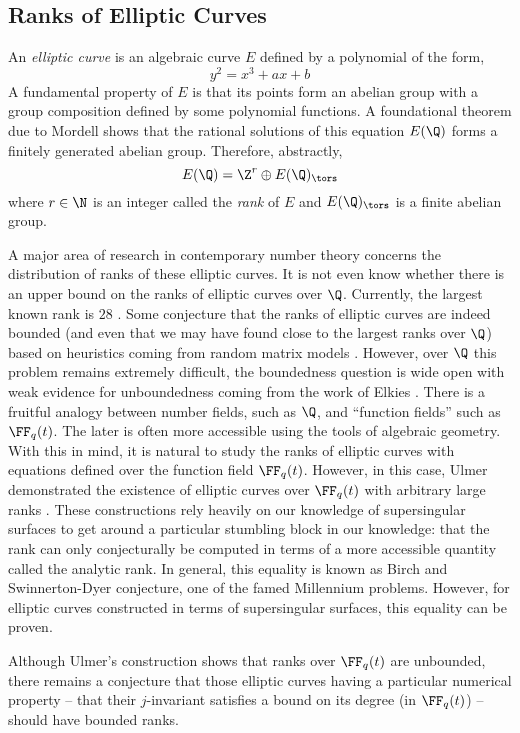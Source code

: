\documentclass[12pt]{article}
\begin{document}
\subsection{Ranks of Elliptic Curves}

An \textit{elliptic curve} is an algebraic curve $E$ defined by a polynomial of the form,
\[ y^2 = x^3 + ax + b \]
A fundamental property of $E$ is that its points form an abelian group with a group composition defined by some polynomial functions. A foundational theorem due to Mordell shows that the rational solutions of this equation $E(\Q)$ forms a finitely generated abelian group. Therefore, abstractly,
\[ E(\Q) = \Z^r \oplus E(\Q)_{\tors} \]
where $r \in \N$ is an integer called the \textit{rank} of $E$ and $E(\Q)_{\tors}$ is a finite abelian group. 
\bigskip \par
A major area of research in contemporary number theory concerns the distribution of ranks of these elliptic curves. It is not even know whether there is an upper bound on the ranks of elliptic curves over $\Q$. Currently, the largest known rank is $28$ \cite{elkies_28}. Some conjecture that the ranks of elliptic curves are indeed bounded (and even that we may have found close to the largest ranks over $\Q$) based on heuristics coming from random matrix models \cite{park_heuristic}. However, over $\Q$ this problem remains extremely difficult, the boundedness question is wide open with weak evidence for unboundedness coming from the work of Elkies \cite{elkies}. There is a fruitful analogy between number fields, such as $\Q$, and ``function fields'' such as $\FF_q(t)$. The later is often more accessible using the tools of algebraic geometry. With this in mind, it is natural to study the ranks of elliptic curves with equations defined over the function field $\FF_q(t)$. However, in this case, Ulmer demonstrated the existence of elliptic curves over $\FF_q(t)$ with arbitrary large ranks \cite{ulmer}. These constructions rely heavily on our knowledge of supersingular surfaces to get around a particular stumbling block in our knowledge: that the rank can only conjecturally be computed in terms of a more accessible quantity called the analytic rank. In general, this equality is known as Birch and Swinnerton-Dyer conjecture, one of the famed Millennium problems. However, for elliptic curves constructed in terms of supersingular surfaces, this equality can be proven. 
\bigskip \par
Although Ulmer's construction shows that ranks over $\FF_q(t)$ are unbounded, there remains a conjecture that those elliptic curves having a particular numerical property -- that their $j$-invariant satisfies a bound on its degree (in $\FF_q(t)$) -- should have bounded ranks.
\end{document}
